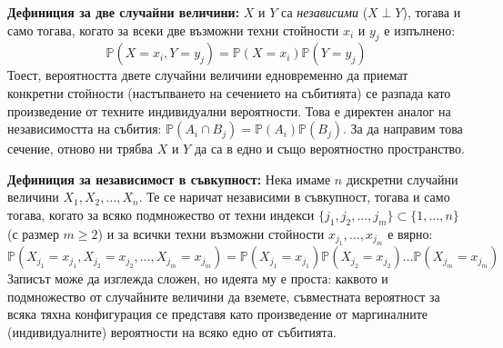 \documentclass{article}
\begin{document}
\textbf{Дефиниция за две случайни величини:} $X$ и $Y$ са \textit{независими} ($X \perp Y$), тогава и само тогава, когато за всеки две възможни техни стойности $x_i$ и $y_j$ е изпълнено:
\[ \mathbb{P}(X = x_i, Y = y_j) = \mathbb{P}(X = x_i) \mathbb{P}(Y = y_j) \]
Тоест, вероятността двете случайни величини едновременно да приемат конкретни стойности (настъпването на сечението на събитията) се разпада като произведение от техните индивидуални вероятности. Това е директен аналог на независимостта на събития: $\mathbb{P}(A_i \cap B_j) = \mathbb{P}(A_i)\mathbb{P}(B_j)$. За да направим това сечение, отново ни трябва $X$ и $Y$ да са в едно и също вероятностно пространство.

\textbf{Дефиниция за независимост в съвкупност:} Нека имаме $n$ дискретни случайни величини $X_1, X_2, \dots, X_n$. Те се наричат независими в съвкупност, тогава и само тогава, когато за всяко подмножество от техни индекси $\{j_1, j_2, \dots, j_m\} \subset \{1, \dots, n\}$ (с размер $m \ge 2$) и за всички техни възможни стойности $x_{j_1}, \dots, x_{j_m}$ е вярно:
\[ \mathbb{P}(X_{j_1} = x_{j_1}, X_{j_2} = x_{j_2}, \dots, X_{j_m} = x_{j_m}) = \mathbb{P}(X_{j_1} = x_{j_1}) \mathbb{P}(X_{j_2} = x_{j_2}) \dots \mathbb{P}(X_{j_m} = x_{j_m}) \]
Записът може да изглежда сложен, но идеята му е проста: каквото и подмножество от случайните величини да вземете, съвместната вероятност за всяка тяхна конфигурация се представя като произведение от маргиналните (индивидуалните) вероятности на всяко едно от събитията.
\end{document}
